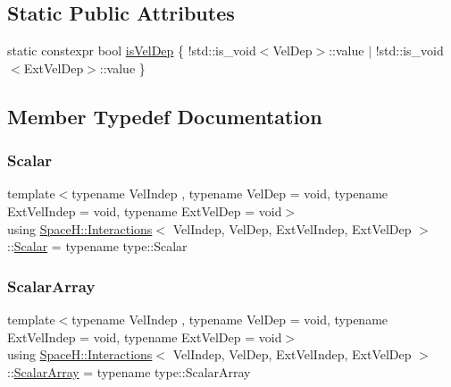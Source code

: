 \subsection*{Static Public Attributes}
\begin{DoxyCompactItemize}
\item 
static constexpr bool \mbox{\hyperlink{class_space_h_1_1_interactions_a99b83df9531e4eb96ed24c093241b9d8}{is\+Vel\+Dep}} \{ !std\+::is\+\_\+void$<$Vel\+Dep$>$\+::value $\vert$ !std\+::is\+\_\+void$<$Ext\+Vel\+Dep$>$\+::value \}
\end{DoxyCompactItemize}


\subsection{Member Typedef Documentation}
\mbox{\label{class_space_h_1_1_interactions_a75aa1c0790d493ec5c64bb13087b8125}} 
\subsubsection{\texorpdfstring{Scalar}{Scalar}}
{\footnotesize\ttfamily template$<$typename Vel\+Indep , typename Vel\+Dep  = void, typename Ext\+Vel\+Indep  = void, typename Ext\+Vel\+Dep  = void$>$ \\
using \mbox{\hyperlink{class_space_h_1_1_interactions}{Space\+H\+::\+Interactions}}$<$ Vel\+Indep, Vel\+Dep, Ext\+Vel\+Indep, Ext\+Vel\+Dep $>$\+::\mbox{\hyperlink{class_space_h_1_1_interactions_a75aa1c0790d493ec5c64bb13087b8125}{Scalar}} =  typename type\+::\+Scalar}

\mbox{\label{class_space_h_1_1_interactions_ad883cb84fcf3379499fade542310632e}} 
\subsubsection{\texorpdfstring{Scalar\+Array}{ScalarArray}}
{\footnotesize\ttfamily template$<$typename Vel\+Indep , typename Vel\+Dep  = void, typename Ext\+Vel\+Indep  = void, typename Ext\+Vel\+Dep  = void$>$ \\
using \mbox{\hyperlink{class_space_h_1_1_interactions}{Space\+H\+::\+Interactions}}$<$ Vel\+Indep, Vel\+Dep, Ext\+Vel\+Indep, Ext\+Vel\+Dep $>$\+::\mbox{\hyperlink{class_space_h_1_1_interactions_ad883cb84fcf3379499fade542310632e}{Scalar\+Array}} =  typename type\+::\+Scalar\+Array}

